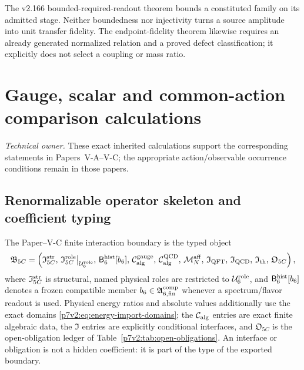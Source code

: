 \documentclass[11pt,a4paper]{article}
\newcommand{\Urole}{\mathcal U_6^{\rm role}}
\newcommand{\Istr}{\mathfrak I_{5C}^{\rm str}}
\newcommand{\Irole}{\mathfrak I_{5C}^{\rm role}}
\newcommand{\Brawsix}{\mathsf B_{6}^{\rm hist}}
\newcommand{\Acompsix}{\mathfrak A_{6,{\rm fin}}^{\rm comp}}
\begin{document}
The v2.166 bounded-required-readout theorem bounds a constituted family on
its admitted stage. Neither boundedness nor injectivity turns a source
amplitude into unit transfer fidelity. The endpoint-fidelity theorem likewise
requires an already generated normalized relation and a proved defect
classification; it explicitly does not select a coupling or mass ratio.






\section{Gauge, scalar and common-action comparison calculations}
\label{p5d:sec:E}
\noindent\textit{Technical owner.} These exact inherited calculations
support the corresponding statements in Papers~V-A--V-C;
the appropriate action/observable occurrence conditions remain in those papers.
\subsection{Renormalizable operator skeleton and coefficient typing}
\label{p7v2:sec:operator-skeleton}

\begin{definition}
\label{p7v2:def:finite-interaction-boundary}
The Paper--V-C finite interaction boundary is the typed object
\begin{equation}
\label{p7v2:eq:finite-interaction-boundary}
 \mathfrak B_{5C}
 =
 \left(
  \Istr,\,
  \Irole\big|_{\Urole},\,
  \Brawsix[b_6],\,
  \mathcal C_{\rm alg}^{\rm gauge},\,
  \mathcal C_{\rm alg}^{\rm QCD},\,
  \mathcal M_N^{\rm aff},\,
  \mathfrak I_{\rm QFT},\,
  \mathfrak I_{\rm QCD},\,
  \mathfrak I_{\rm th},\,
  \mathfrak O_{5C}
 \right),
\end{equation}
where \(\Istr\) is structural, named physical roles are restricted to
\(\Urole\), and \(\Brawsix[b_6]\) denotes a frozen compatible member
\(b_6\in\Acompsix\) whenever a spectrum/flavor readout is used.  Physical
energy ratios and absolute values additionally use the exact domains
\eqref{p7v2:eq:energy-import-domains};
the \(\mathcal C_{\rm alg}\) entries are exact finite algebraic data, the
\(\mathfrak I\) entries are explicitly conditional interfaces, and
\(\mathfrak O_{5C}\) is the open-obligation ledger of
Table~\ref{p7v2:tab:open-obligations}.  An interface or obligation is not a
hidden coefficient: it is part of the type of the exported boundary.
\end{definition}
\end{document}
